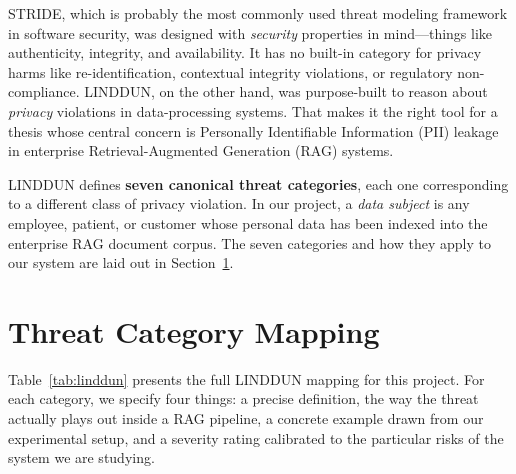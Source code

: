 \documentclass[a4paper,12pt]{report}
\begin{document}
STRIDE, which is probably the most commonly used threat modeling framework
in software security, was designed with \emph{security} properties in
mind---things like authenticity, integrity, and availability. It has no
built-in category for privacy harms like re-identification, contextual
integrity violations, or regulatory non-compliance.
LINDDUN, on the other hand, was purpose-built to reason about
\emph{privacy} violations in data-processing systems. That makes it the
right tool for a thesis whose central concern is Personally Identifiable
Information (PII) leakage in enterprise Retrieval-Augmented Generation
(RAG) systems.

LINDDUN defines \textbf{seven canonical threat categories}, each one
corresponding to a different class of privacy violation. In our project,
a \emph{data subject} is any employee, patient, or customer whose
personal data has been indexed into the enterprise RAG document corpus.
The seven categories and how they apply to our system are laid out in
Section~\ref{sec:linddun-table}.

\section{Threat Category Mapping}
\label{sec:linddun-table}

Table~\ref{tab:linddun} presents the full LINDDUN mapping for this project.
For each category, we specify four things: a precise definition, the way
the threat actually plays out inside a RAG pipeline, a concrete example
drawn from our experimental setup, and a severity rating calibrated to the
particular risks of the system we are studying.

\vspace{0.4cm}
\end{document}

